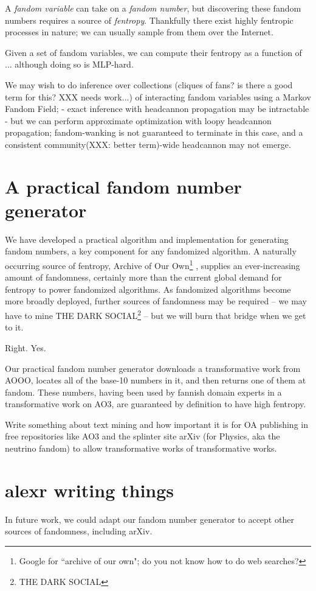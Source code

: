 \documentclass[9pt]{sigplanconf}
\begin{document}
A \emph{fandom variable} can take on a \emph{fandom number}, but discovering
these fandom numbers requires a source of \emph{fentropy}. Thankfully there
exist highly fentropic processes in nature; we can usually sample from them
over the Internet.

Given a set of fandom variables, we can compute their fentropy as a function of
... although doing so is MLP-hard.

We may wish to do inference over collections (cliques of fans? is there a good
term for this? XXX needs work...) of interacting fandom variables using a
Markov Fandom Field; 
- exact inference with headcannon propagation may be intractable
- but we can perform approximate optimization with loopy headcannon
  propagation; fandom-wanking is not guaranteed to terminate in this case, and
  a consistent community(XXX: better term)-wide headcannon may not emerge.

\section{A practical fandom number generator}
We have developed a practical algorithm and implementation for
generating fandom numbers, a key component for any fandomized
algorithm. A naturally occurring source of fentropy, Archive of Our
Own\footnote{Google for ``archive of our own"; do you not know how to
  do web searches?\footnotemark}
, supplies an
ever-increasing amount of fandomness, certainly more than the current
global demand for fentropy to power fandomized algorithms. As
fandomized algorithms become more broadly deployed, further sources of
fandomness may be required -- we may have to mine THE DARK
SOCIAL\footnote{THE DARK SOCIAL} -- but we will burn that bridge when
we get to it.

Right. Yes.

Our practical fandom number generator downloads a transformative work from
AOOO, locates all of the base-10 numbers in it, and then returns one of them at
fandom. These numbers, having been used by fannish domain experts in a
transformative work on AO3, are guaranteed by definition to have high fentropy.

Write something about text mining and how important it is for OA publishing in
free repositories like AO3 and the splinter site arXiv (for Physics, aka the
neutrino fandom) to allow transformative works of transformative works.  

\section{alexr writing things}
In future work, we could adapt our fandom number generator to accept other
sources of fandomness, including arXiv.
\end{document}
